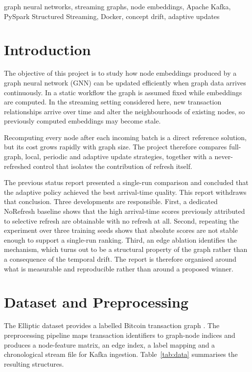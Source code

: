 \documentclass[conference]{IEEEtran}
\begin{document}
\begin{IEEEkeywords}
graph neural networks, streaming graphs, node embeddings, Apache Kafka,
PySpark Structured Streaming, Docker, concept drift, adaptive updates
\end{IEEEkeywords}

\section{Introduction}

The objective of this project is to study how node embeddings produced by a
graph neural network (GNN) can be updated efficiently when graph data arrives
continuously. In a static workflow the graph is assumed fixed while embeddings
are computed. In the streaming setting considered here, new transaction
relationships arrive over time and alter the neighbourhoods of existing nodes,
so previously computed embeddings may become stale.

Recomputing every node after each incoming batch is a direct reference
solution, but its cost grows rapidly with graph size. The project therefore
compares full-graph, local, periodic and adaptive update strategies, together
with a never-refreshed control that isolates the contribution of refresh
itself.

The previous status report presented a single-run comparison and concluded that
the adaptive policy achieved the best arrival-time quality. This report
withdraws that conclusion. Three developments are responsible. First, a
dedicated NoRefresh baseline shows that the high arrival-time scores previously
attributed to selective refresh are obtainable with no refresh at all. Second,
repeating the experiment over three training seeds shows that absolute scores
are not stable enough to support a single-run ranking. Third, an edge ablation
identifies the mechanism, which turns out to be a structural property of the
graph rather than a consequence of the temporal drift. The report is therefore
organised around what is measurable and reproducible rather than around a
proposed winner.

\section{Dataset and Preprocessing}

The Elliptic dataset provides a labelled Bitcoin transaction graph
\cite{weber2019}. The preprocessing pipeline maps transaction identifiers to
graph-node indices and produces a node-feature matrix, an edge index, a label
mapping and a chronological stream file for Kafka ingestion.
Table~\ref{tab:data} summarises the resulting structures.
\end{document}
